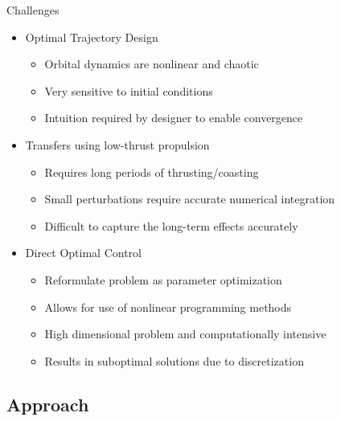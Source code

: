 \begin{frame}{Challenges} %

\begin{itemize}
    \item Optimal Trajectory Design
        \begin{itemize}
            \item Orbital dynamics are nonlinear and chaotic
            \item Very sensitive to initial conditions
            \item Intuition required by designer to enable convergence
        \end{itemize}
    \pause
    \item Transfers using low-thrust propulsion
        \begin{itemize}
            \item Requires long periods of thrusting/coasting
            \item Small perturbations require accurate numerical integration
            \item Difficult to capture the long-term effects accurately
        \end{itemize}
    \pause
    \item Direct Optimal Control
        \begin{itemize}
            \item Reformulate problem as parameter optimization
            \item Allows for use of nonlinear programming methods
            \item High dimensional problem and computationally intensive
            \item Results in suboptimal solutions due to discretization
        \end{itemize}
\end{itemize}
\end{frame}   %

\subsection{Approach}

